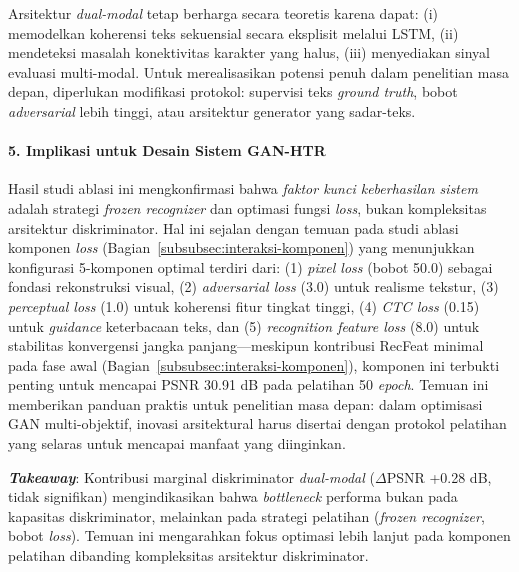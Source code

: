 \documentclass[12pt,a4paper]{article}
\begin{document}
Arsitektur \textit{dual-modal} tetap berharga secara teoretis karena dapat: (i) memodelkan koherensi teks sekuensial secara eksplisit melalui LSTM, (ii) mendeteksi masalah konektivitas karakter yang halus, (iii) menyediakan sinyal evaluasi multi-modal. Untuk merealisasikan potensi penuh dalam penelitian masa depan, diperlukan modifikasi protokol: supervisi teks \textit{ground truth}, bobot \textit{adversarial} lebih tinggi, atau arsitektur generator yang sadar-teks.

\vspace{0.5em}

\paragraph{5. Implikasi untuk Desain Sistem GAN-HTR}

Hasil studi ablasi ini mengkonfirmasi bahwa \textit{faktor kunci keberhasilan sistem} adalah strategi \textit{frozen recognizer} dan optimasi fungsi \textit{loss}, bukan kompleksitas arsitektur diskriminator. Hal ini sejalan dengan temuan pada studi ablasi komponen \textit{loss} (Bagian~\ref{subsubsec:interaksi-komponen}) yang menunjukkan konfigurasi 5-komponen optimal terdiri dari: (1) \textit{pixel loss} (bobot 50.0) sebagai fondasi rekonstruksi visual, (2) \textit{adversarial loss} (3.0) untuk realisme tekstur, (3) \textit{perceptual loss} (1.0) untuk koherensi fitur tingkat tinggi, (4) \textit{CTC loss} (0.15) untuk \textit{guidance} keterbacaan teks, dan (5) \textit{recognition feature loss} (8.0) untuk stabilitas konvergensi jangka panjang—meskipun kontribusi RecFeat minimal pada fase awal (Bagian~\ref{subsubsec:interaksi-komponen}), komponen ini terbukti penting untuk mencapai PSNR 30.91 dB pada pelatihan 50 \textit{epoch}. Temuan ini memberikan panduan praktis untuk penelitian masa depan: dalam optimisasi GAN multi-objektif, inovasi arsitektural harus disertai dengan protokol pelatihan yang selaras untuk mencapai manfaat yang diinginkan.

\vspace{0.3em}

\noindent
\textbf{\textit{Takeaway}}: Kontribusi marginal diskriminator \textit{dual-modal} ($\Delta$PSNR +0.28 dB, tidak signifikan) mengindikasikan bahwa \textit{bottleneck} performa bukan pada kapasitas diskriminator, melainkan pada strategi pelatihan (\textit{frozen recognizer}, bobot \textit{loss}). Temuan ini mengarahkan fokus optimasi lebih lanjut pada komponen pelatihan dibanding kompleksitas arsitektur diskriminator.
\end{document}
